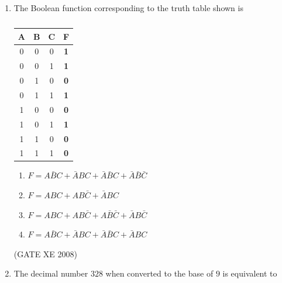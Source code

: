 \documentclass[12pt]{article}
\begin{document}
\begin{enumerate}
\begin{enumerate}
\end{enumerate}

(GATE XE 2008)
\item  The Boolean function corresponding to the truth table shown is

\begin{table}[H]     \centering     \caption{}     \label{}     \begin{tabular}{c|c|c|c}
    A & B & C & \textbf{F}  \\
    \hline
    0 & 0 & 0 & \textbf{1}   \\
    \hline
    0 & 0 & 1 & \textbf{1}  \\
    \hline
    0 & 1 & 0 & \textbf{0} \\
    \hline
    0 & 1 & 1 & \textbf{1} \\
    \hline
    1 & 0 & 0 & \textbf{0} \\
    \hline
    1 & 0 & 1 & \textbf{1} \\
    \hline
    1 & 1 & 0 & \textbf{0} \\
    \hline
    1 & 1 & 1 & \textbf{0} \\
    \hline
\end{tabular} \end{table}

\begin{enumerate}
\item  $F=A\bar{B}C + \bar{A}BC +\bar{A}\bar{B}C + \bar{A}\bar{B}\bar{C}$
\item  $F=ABC + AB\bar{C} + \bar{A}BC$
\item  $F=ABC + AB\bar{C} +A\bar{B}\bar{C} +\bar{A}B\bar{C}$
\item  $F=A\bar{B}C + \bar{A}BC + \bar{A}\bar{B}C + \bar{A}BC$
\end{enumerate}

(GATE XE 2008)
\item  The decimal number $328$ when converted to the base of $9$ is equivalent to

\begin{enumerate}
\end{enumerate}


\end{enumerate}
\end{document}
